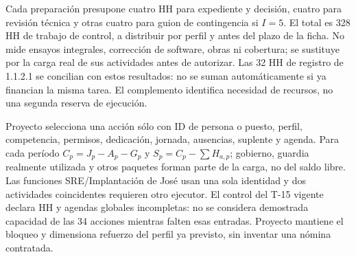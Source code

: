 Cada preparación presupone cuatro HH para expediente y decisión, cuatro para revisión técnica y otras cuatro para guion de contingencia si $I=5$. El total es 328 HH de trabajo de control, a distribuir por perfil y antes del plazo de la ficha. No mide ensayos integrales, corrección de software, obras ni cobertura; se sustituye por la carga real de sus actividades antes de autorizar. Las 32 HH de registro de 1.1.2.1 se concilian con estos resultados: no se suman automáticamente si ya financian la misma tarea. El complemento identifica necesidad de recursos, no una segunda reserva de ejecución.

Proyecto selecciona una acción sólo con ID de persona o puesto, perfil, competencia, permisos, dedicación, jornada, ausencias, suplente y agenda. Para cada período $C_p=J_p-A_p-G_p$ y $S_p=C_p-\sum H_{a,p}$; gobierno, guardia realmente utilizada y otros paquetes forman parte de la carga, no del saldo libre. Las funciones SRE/Implantación de José usan una sola identidad y dos actividades coincidentes requieren otro ejecutor. El control del T-15 vigente declara HH y agendas globales incompletas: no se considera demostrada capacidad de las 34 acciones mientras falten esas entradas. Proyecto mantiene el bloqueo y dimensiona refuerzo del perfil ya previsto, sin inventar una nómina contratada.

